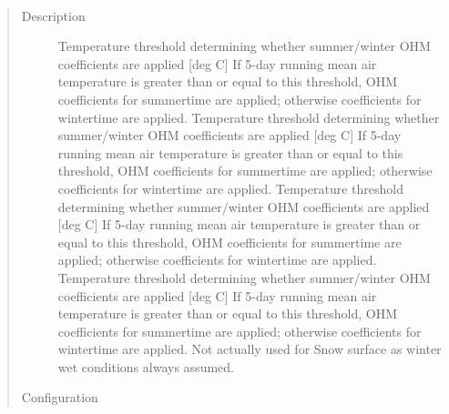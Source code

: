 \documentclass[letterpaper,10pt,english]{sphinxmanual}
\begin{document}

\begin{fulllineitems}
\label{\detokenize{input_files/SUEWS_SiteInfo/Input_Options:cmdoption-arg-ohmthresh-sw}}~\begin{quote}\begin{description}
\item[{Description}] \leavevmode
Temperature threshold determining whether summer/winter OHM coefficients are applied {[}deg C{]} If 5-day running mean air temperature is greater than or equal to this threshold, OHM coefficients for summertime are applied; otherwise coefficients for wintertime are applied.  Temperature threshold determining whether summer/winter OHM coefficients are applied {[}deg C{]} If 5-day running mean air temperature is greater than or equal to this threshold, OHM coefficients for summertime are applied; otherwise coefficients for wintertime are applied.  Temperature threshold determining whether summer/winter OHM coefficients are applied {[}deg C{]} If 5-day running mean air temperature is greater than or equal to this threshold, OHM coefficients for summertime are applied; otherwise coefficients for wintertime are applied.  Temperature threshold determining whether summer/winter OHM coefficients are applied {[}deg C{]} If 5-day running mean air temperature is greater than or equal to this threshold, OHM coefficients for summertime are applied; otherwise coefficients for wintertime are applied. Not actually used for Snow surface as winter wet conditions always assumed.

\item[{Configuration}] \leavevmode


\end{description}
\end{quote}
\end{fulllineitems}
\end{document}
